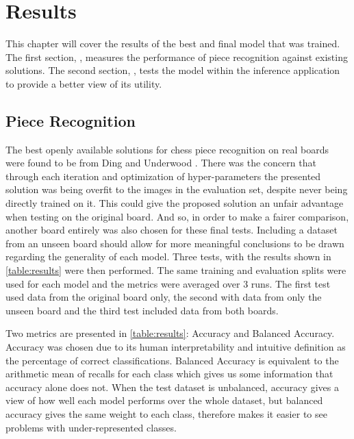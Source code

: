 \chapter{Results}
\label{results}

This chapter will cover the results of the best and final model that was trained.  The first section, , measures the performance
of piece recognition against existing solutions.  The second section, , tests the model within the inference application
to provide a better view of its utility.

\section{Piece Recognition}
\label{evaluation}

The best openly available solutions for chess piece recognition on real boards were found to be from Ding \cite{Ding2016ChessVisionC} and Underwood \cite{chessvgg}.
There was the concern that through each iteration and optimization of hyper-parameters the presented solution was being overfit to the 
images in the evaluation set, despite never being directly trained on it.  This could give the proposed solution an unfair advantage when testing on the original board.
And so, in order to make a fairer comparison, another board entirely was also chosen for these final tests.  
Including a dataset from an unseen board should allow for more meaningful conclusions to be drawn regarding the generality of each model.
Three tests, with the results shown in \autoref{table:results} were then performed.  The same training and evaluation splits were used for each model and 
the metrics were averaged over 3 runs.  The first test used data from the original board only, the second with data from only the unseen board and the 
third test included data from both boards.

Two metrics are presented in \ref{table:results}: Accuracy and Balanced Accuracy.  Accuracy was chosen due to its human
interpretability and intuitive definition as the percentage of correct classifications.  Balanced Accuracy is equivalent to the arithmetic mean of recalls 
for each class which gives us some information that accuracy alone does not.  When the test dataset is unbalanced, accuracy gives a view of 
how well each model performs over the whole dataset, but balanced accuracy gives the same weight to each class, therefore makes it easier to see problems 
with under-represented classes.

